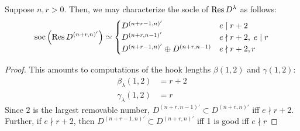 \documentclass{amsart}
\begin{document}
\begin{lemma}
  Suppose $n,r > 0$.
  Then, we may characterize the socle of $\text{Res} \, D^\lambda$ as follows:
  \[
    \text{soc}\left( \text{Res} \, D^{(n+r,n)'} \right) \simeq \begin{cases}
      D^{(n + r - 1,n)'} & e \mid r+2\\
      D^{(n + r,n-1)'} & e \nmid r+2, \; e \mid r\\
      D^{(n+r-1,n)'} \oplus D^{(n+r,n-1)} & e \nmid r+2,r
    \end{cases}
  \]
\end{lemma}
\begin{proof}
  This amounts to computations of the hook lengths $\beta(1,2)$ and $\gamma(1,2)$:
  \begin{align*}
    \beta_\lambda(1,2) &= r + 2\\
    \gamma_\lambda(1,2) &= r
  \end{align*}
  Since $2$ is the largest removable number, $D^{(n+r,n-1)'} \subset D^{(n+r,n)'}$ iff $e \nmid r + 2$.
  Further, if $e \nmid r + 2$, then $D^{(n+r-1,n)'} \subset D^{(n+r,n)'}$ iff 1 is good iff $e \nmid r$
\end{proof}
\end{document}

